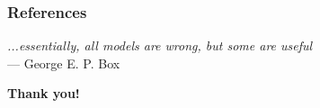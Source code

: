 \documentclass[10pt]{beamer}
\begin{document}
\begin{frame}
  \frametitle{References}
  \begin{small}
    \def\newblock{\hskip .11em plus .33em minus .07em} %
    
    
  \end{small}
\end{frame}


\begin{frame}[plain]

  \addtocounter{framenumber}{-1}

\emph{...essentially, all models are wrong, but some are useful}\\
\hfill --- George E. P. Box
\vspace{1cm}
  \begin{center}
    {\color{SUblue} \textbf{\Huge Thank you!}}
  \end{center}

\end{frame}
\end{document}
